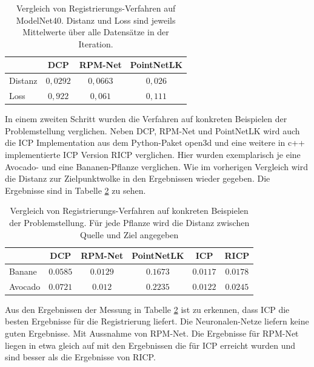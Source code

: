 \documentclass[12pt,titlepage, twoside]{article}
\begin{document}
\begin{table}
\begin{center}
\begin{tabular}{|l || c | c | c | } 
    \hline
     & DCP & RPM-Net & PointNetLK \\  
    \hline
    \hline
    Distanz & $0,0292$ & $0,0663$& $0,026$\\
    \hline
    Loss & $0,922$& $0,061$& $0,111$\\
    \hline
\end{tabular}
\end{center}
\caption{Vergleich von Registrierungs-Verfahren auf ModelNet40. Distanz und Loss sind jeweils Mittelwerte über alle Datensätze in der Iteration.}
\label{tab:registration:deeplearn:compare}
\end{table}

In einem zweiten Schritt wurden die Verfahren auf konkreten Beispielen der Problemstellung verglichen. 
Neben DCP, RPM-Net und PointNetLK wird auch die ICP Implementation aus dem Python-Paket open3d \cite{zhou2018open3d} und eine weitere in c++ implementierte ICP Version RICP verglichen.
Hier wurden exemplarisch je eine Avocado- und eine Bananen-Pflanze verglichen. Wie im vorherigen Vergleich wird die Distanz zur Zielpunktwolke in den Ergebnissen wieder gegeben.
Die Ergebnisse sind in Tabelle \ref{tab:registration:real:compare} zu sehen.

\begin{table}
    \begin{center}
    \begin{tabular}{|l || c | c | c | c | c | } 
        \hline
         & DCP & RPM-Net & PointNetLK & ICP & RICP \\  
        \hline
        \hline
        Banane & $0.0585$ & $0.0129$& $0.1673$& $0.0117$& $0.0178$\\
        \hline
        Avocado & $0.0721$& $0.012$& $0.2235$& $0.0122$& $0.0245$\\
        \hline
    \end{tabular}
    \end{center}
    \caption{Vergleich von Registrierungs-Verfahren auf konkreten Beispielen der Problemstellung. Für jede Pflanze wird die Distanz zwischen Quelle und Ziel angegeben}
    \label{tab:registration:real:compare}
\end{table}

Aus den Ergebnissen der Messung in Tabelle \ref{tab:registration:real:compare} ist zu erkennen, dass ICP die besten Ergebnisse für die Registrierung liefert. 
Die Neuronalen-Netze liefern keine guten Ergebnisse. Mit Aussnahme von RPM-Net. Die Ergebnisse für RPM-Net liegen in etwa gleich auf mit den Ergebnissen die für ICP erreicht wurden und sind besser als die Ergebnisse von RICP.
\end{document}
